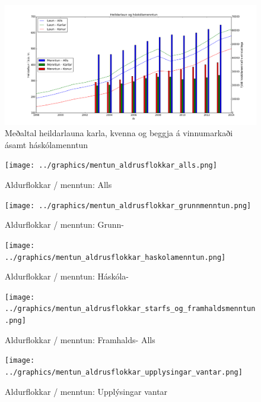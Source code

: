 \documentclass[12pt, git, draft]{rureport}
\begin{document}
\begin{figure}
	\centering 
	\includegraphics[width=\textwidth]{graphics/heildar_laun_og_haskolamentun.png}
	\caption{Meðaltal heildarlauna karla, kvenna og beggja á vinnumarkaði ásamt háskólamenntun \label{fig:heildarhask}}
\end{figure}


\begin{figure}
	\centering 
	\texttt{[image: ../graphics/mentun\_aldrusflokkar\_alls.png]}
	\caption{Aldurflokkar / menntun: Alls \label{fig:menntunall}}
\end{figure}

\begin{figure}
	\centering 
	\texttt{[image: ../graphics/mentun\_aldrusflokkar\_grunnmenntun.png]}
	\caption{Aldurflokkar / menntun: Grunn- \label{fig:menntungrunn}}
\end{figure}

\begin{figure}
	\centering 
	\texttt{[image: ../graphics/mentun\_aldrusflokkar\_haskolamenntun.png]}
	\caption{Aldurflokkar / menntun: Háskóla- \label{fig:menntunhs}}
\end{figure}

\begin{figure}
	\centering 
	\texttt{[image: ../graphics/mentun\_aldrusflokkar\_starfs\_og\_framhaldsmenntun.png]}
	\caption{Aldurflokkar / menntun: Framhalds- Alls \label{fig:menntunfram}}
\end{figure}

\begin{figure}
	\centering 
	\texttt{[image: ../graphics/mentun\_aldrusflokkar\_upplysingar\_vantar.png]}
	\caption{Aldurflokkar / menntun: Upplýsingar vantar \label{fig:menntunvantar}}
\end{figure}
\end{document}
